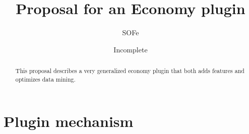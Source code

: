 \documentclass{report}
\title{Proposal for an Economy plugin}
\date{Incomplete}
\author{SOFe}
\begin{document}

	\maketitle
	\tableofcontents

	\begin{abstract}
		This proposal describes a very generalized economy plugin that both adds features and optimizes data mining.
	\end{abstract}

	\part{Plugin mechanism}

	
\end{document}

